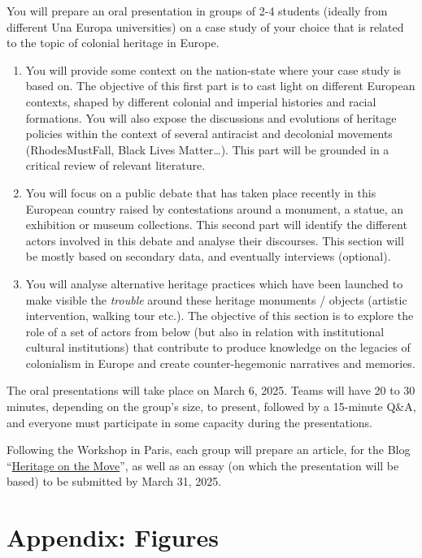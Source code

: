 \documentclass{scrartcl}
\begin{document}
\begin{appendices}
You will prepare an oral presentation in groups of 2-4 students (ideally from different Una Europa universities) on a case study of your choice that is related to the topic of colonial heritage in Europe. 



\begin{enumerate}
    \item You will provide some context on the nation-state where your case study is based on. The objective of this first part is to cast light on different European contexts, shaped by different colonial and imperial histories and racial formations. You will also expose the discussions and evolutions of heritage policies within the context of several antiracist and decolonial movements (RhodesMustFall, Black Lives Matter…). This part will be grounded in a critical review of relevant literature.
    \item You will focus on a public debate that has taken place recently in this European country raised by contestations around a monument, a statue, an exhibition or museum collections. This second part will identify the different actors involved in this debate and analyse their discourses. This section will be mostly based on secondary data, and eventually interviews (optional).
    \item  You will analyse alternative heritage practices which have been launched to make visible the \textit{trouble} around these heritage monuments / objects (artistic intervention, walking tour etc.). The objective of this section is to explore the role of a set of actors from below (but also in relation with institutional cultural institutions) that contribute to produce knowledge on the legacies of colonialism in Europe and create counter-hegemonic narratives and memories. 
\end{enumerate}

 The oral presentations will take place on March 6, 2025. Teams will have 20 to 30 minutes, depending on the group’s size, to present, followed by a 15-minute Q\&A, and everyone must participate in some capacity during the presentations.

Following the Workshop in Paris, each group will prepare an article, for the Blog “\href{https://herblog.hypotheses.org/}{Heritage on the Move}”, as well as an essay (on which the presentation will be based) to be submitted by March 31, 2025.


\section{Appendix: Figures}\label{sec:figure}


\end{appendices}
\end{document}
